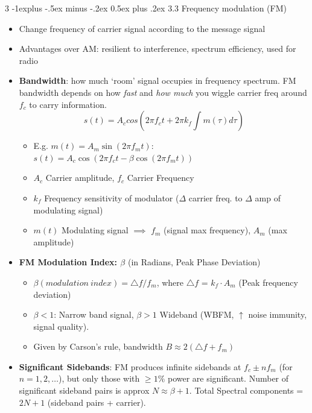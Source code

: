 \documentclass[a4paper, 9pt, landscape]{extarticle}
\makeatletter
\renewcommand{\subsection}{\@startsection{subsection}{2}{0mm}%
                                {-1explus -.5ex minus -.2ex}%
                                {0.5ex plus .2ex}%
                                {\normalfont\normalsize\bfseries}}
\makeatother
\begin{document}
\begin{multicols*}{3}
\subsection{3.3 Frequency modulation (FM)}
\begin{itemize}
  \item Change frequency of carrier signal according to the message signal
  \item Advantages over AM: resilient to interference, spectrum efficiency, used for radio
  \item \textbf{Bandwidth}: how much `room' signal occupies in frequency spectrum. FM bandwidth depends on how \textit{fast} and \textit{how much} you wiggle carrier freq around $f_c$ to carry information.
      \[
        \boxed{s(t) = A_c cos (2\pi f_c t + 2\pi k_f \int m(\tau) d\tau)}
      \] 
    \begin{itemize}
      \item E.g. $m(t) = A_m \sin(2\pi f_m t)$: $s(t) = A_c \cos \left( 2\pi f_c t - \beta \cos(2\pi f_m t) \right)$
      \item $A_c$ Carrier amplitude, $f_c$ Carrier Frequency
      \item $k_f$ Frequency sensitivity of modulator ($\Delta$ carrier freq. to $\Delta$ amp of modulating signal)
      \item $m(t)$ Modulating signal $\implies$ $f_m$ (signal max frequency), $A_m$ (max amplitude)
    \end{itemize}
  \item \textbf{FM Modulation Index: $\beta$} (in Radians, Peak Phase Deviation)
  \begin{itemize}
    \item $\beta(modulation \ index) = \triangle f / f_m$, where $\triangle f$ = $k_f \cdot A_m$ (Peak frequency deviation)
    \item $\beta < 1$: Narrow band signal, $\beta > 1$ Wideband (WBFM, $\uparrow$ noise immunity, signal quality).
    \item Given by Carson's rule, bandwidth $B \approx 2 (\triangle f + f_m)$
  \end{itemize}
  \item \textbf{Significant Sidebands}: FM produces infinite sidebands at $f_c \pm n f_m$ (for $n = 1, 2, \dots$), but only those with $\geq 1\%$ power are significant. Number of significant sideband pairs is approx $N \approx \beta + 1$. Total Spectral components = $2N + 1$ (sideband pairs + carrier).
\end{itemize}


\end{multicols*}
\end{document}
